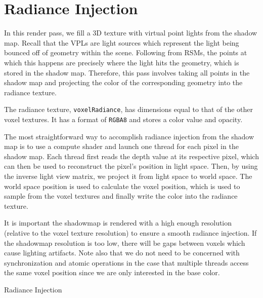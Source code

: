 
\section{Radiance Injection}
In this render pass, we fill a 3D texture with virtual point lights from the shadow map. Recall that the VPLs are light sources which represent the light being bounced off of geometry within the scene. Following from RSMs, the points at which this happens are precisely where the light hits the geometry, which is stored in the shadow map. Therefore, this pass involves taking all points in the shadow map and projecting the color of the corresponding geometry into the radiance texture.

The radiance texture, \texttt{voxelRadiance}, has dimensions equal to that of the other voxel textures. It has a format of \texttt{RGBA8} and stores a color value and opacity.

The most straightforward way to accomplish radiance injection from the shadow map is to use a compute shader and launch one thread for each pixel in the shadow map. Each thread first reads the depth value at its respective pixel, which can then be used to reconstruct the pixel's position in light space. Then, by using the inverse light view matrix, we project it from light space to world space. The world space position is used to calculate the voxel position, which is used to sample from the voxel textures and finally write the color into the radiance texture.

It is important the shadowmap is rendered with a high enough resolution (relative to the voxel texture resolution) to ensure a smooth radiance injection. If the shadowmap resolution is too low, there will be gaps between voxels which cause lighting artifacts. Note also that we do not need to be concerned with synchronization and atomic operations in the case that multiple threads access the same voxel position since we are only interested in the base color.


\begin{algorithm}
    \caption{Radiance Injection}
    \label{alg:radianceinjection}
    \begin{algorithmic}
        \EndProcedure
    \end{algorithmic}
\end{algorithm}

